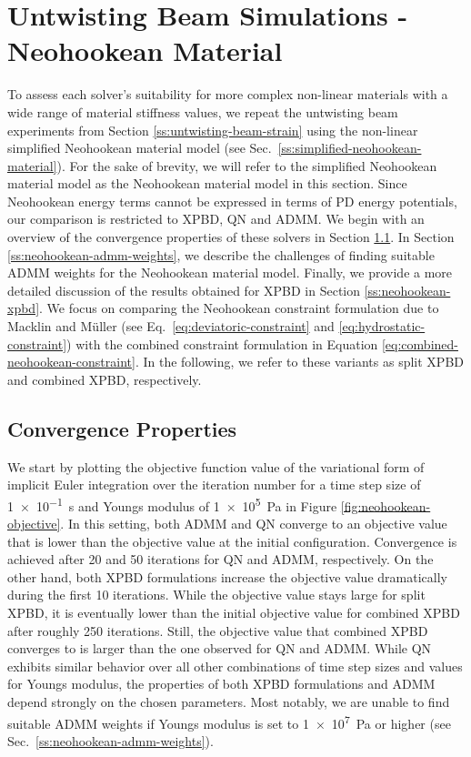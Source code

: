 \section{Untwisting Beam Simulations - Neohookean Material}\label{ss:untwisting-beam-neohookean}
To assess each solver's suitability for more complex non-linear materials with a wide range of material stiffness values, we repeat the untwisting beam 
experiments from Section \ref{ss:untwisting-beam-strain} using the non-linear simplified Neohookean material model (see Sec.\ \ref{ss:simplified-neohookean-material}). 
For the sake of brevity, we will refer to the simplified Neohookean material model as the Neohookean material model in this section. Since Neohookean energy terms cannot 
be expressed in terms of PD energy potentials, our comparison is restricted to XPBD, QN and ADMM. We begin with an overview of the convergence properties of 
these solvers in Section \ref{ss:neohookean-convergence}. In Section \ref{ss:neohookean-admm-weights}, we describe the challenges of finding suitable ADMM weights for 
the Neohookean material model. Finally, we provide a more detailed discussion of the results obtained for XPBD in Section \ref{ss:neohookean-xpbd}. We focus on 
comparing the Neohookean constraint formulation due to Macklin and Müller \cite{macklin2021} (see Eq.\ \ref{eq:deviatoric-constraint} and \ref{eq:hydrostatic-constraint}) 
with the combined constraint formulation in Equation \ref{eq:combined-neohookean-constraint}. In the following, we refer to these variants as split XPBD and combined XPBD, 
respectively.

\subsection{Convergence Properties}\label{ss:neohookean-convergence}
We start by plotting the objective function value of the variational form of implicit Euler integration over the iteration number for a time step size of \SI{1e-1}{\second} 
and Youngs modulus of \SI{1e5}{\pascal} in Figure \ref{fig:neohookean-objective}. In this setting, both ADMM and QN converge to an objective value that is lower 
than the objective value at the initial configuration. Convergence is achieved after 20 and 50 iterations for QN and ADMM, respectively. On the other hand, both XPBD 
formulations increase the objective value dramatically during the first 10 iterations. While the objective value stays large for split XPBD, it is eventually lower than 
the initial objective value for combined XPBD after roughly 250 iterations. Still, the objective value that combined XPBD converges to is larger than the one observed 
for QN and ADMM. While QN exhibits similar behavior over all other combinations of time step sizes and values for Youngs modulus, the properties of both XPBD formulations 
and ADMM depend strongly on the chosen parameters. Most notably, we are unable to find suitable ADMM weights if Youngs modulus is set to \SI{1e7}{\pascal} or higher (see 
Sec.\ \ref{ss:neohookean-admm-weights}).

